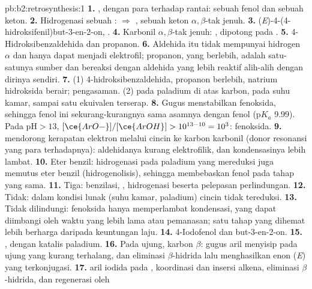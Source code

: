 \begin{solution}{pb:b2:retrosynthesis:1}
\textbf{1.} , dengan  para terhadap rantai: sebuah fenol dan sebuah keton.
\textbf{2.} Hidrogenasi sebuah :  $\Rightarrow$ , sebuah
keton $\alpha,\beta$-tak jenuh.
\textbf{3.} (\textit{E})-4-(4-hidroksifenil)but-3-en-2-on, .
\textbf{4.} Karbonil $\alpha,\beta$-tak jenuh: , dipotong pada .
\textbf{5.} 4-Hidroksibenzaldehida dan propanon.
\textbf{6.} Aldehida itu tidak mempunyai hidrogen $\alpha$ dan hanya dapat
menjadi elektrofil; propanon, yang berlebih, adalah satu-satunya sumber
 dan bereaksi dengan aldehida yang lebih reaktif alih-alih dengan
dirinya sendiri.
\textbf{7.} (1) 4-hidroksibenzaldehida, propanon berlebih, natrium hidroksida
berair; pengasaman. (2)
 pada paladium di atas karbon, pada suhu kamar, sampai satu ekuivalen terserap.
\textbf{8.} Gugus  menstabilkan fenoksida, sehingga fenol ini
sekurang-kurangnya sama asamnya dengan fenol
($\mathrm pK_a$ 9.99). Pada $\mathrm{pH} > 13$, $[\ce{ArO-}]/[\ce{ArOH}] > 10^{13-10} = 10^3$:
fenoksida.
\textbf{9.}  mendorong kerapatan elektron melalui cincin ke karbon
karbonil (donor resonansi yang para terhadapnya): aldehidanya kurang
elektrofilik, dan kondensasinya lebih lambat.
\textbf{10.} Eter benzil: hidrogenasi pada paladium yang mereduksi 
juga memutus eter benzil (hidrogenolisis), sehingga membebaskan fenol pada
tahap yang sama.
\textbf{11.} Tiga: benzilasi, , hidrogenasi beserta
pelepasan perlindungan.
\textbf{12.} Tidak: dalam kondisi lunak (suhu kamar, paladium) cincin
 tidak tereduksi.
\textbf{13.} Tidak dilindungi: fenoksida hanya memperlambat kondensasi, yang
dapat diimbangi oleh waktu yang lebih lama atau pemanasan; satu tahap yang
dihemat lebih berharga daripada keuntungan laju.
\textbf{14.} 4-Iodofenol dan but-3-en-2-on.
\textbf{15.} , dengan katalis paladium.
\textbf{16.} Pada  ujung, karbon $\beta$: gugus aril menyisip pada
ujung yang kurang terhalang, dan eliminasi $\beta$-hidrida lalu menghasilkan
enon (\textit{E}) yang terkonjugasi.
\textbf{17.}  aril iodida pada , koordinasi dan
insersi alkena, eliminasi $\beta$-hidrida, dan regenerasi  oleh

\end{solution}
